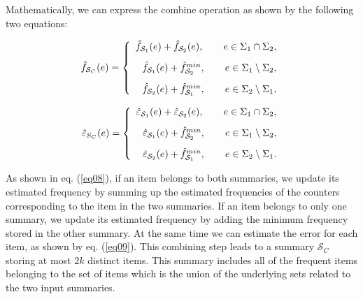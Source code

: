 \documentclass[final,3p,times]{elsarticle}
\begin{document}
Mathematically, we can express the combine operation as shown by the following two equations:

\begin{equation}
\label{eq08}
\hat{f}_{\mathcal{S}_C}(e) = 
\left\lbrace 
\begin{array}{r} 
\vspace{0.3cm}
\hat{f}_{\mathcal{S}_1}(e) + \hat{f}_{\mathcal{S}_2}(e), \qquad e \in \Sigma_1 \cap \Sigma_2, \\
\vspace{0.3cm}
\hat{f}_{\mathcal{S}_1}(e) + \hat{f}_{\mathcal{S}_2}^{min}, \qquad e \in \Sigma_1 \setminus \Sigma_2, \\
\hat{f}_{\mathcal{S}_2}(e) + \hat{f}_{\mathcal{S}_1}^{min}, \qquad e \in \Sigma_2 \setminus \Sigma_1,
\end{array}\right.
\end{equation}

\begin{equation}
\label{eq09}
\hat{\varepsilon}_{S_C}(e) = 
\left\lbrace 
\begin{array}{r} 
\vspace{0.3cm}
\hat{\varepsilon}_{\mathcal{S}_1}(e) + \hat{\varepsilon}_{\mathcal{S}_2}(e), \qquad e \in \Sigma_1 \cap \Sigma_2, \\
\vspace{0.3cm}
\hat{\varepsilon}_{\mathcal{S}_1}(e) + \hat{f}_{\mathcal{S}_2}^{min}, \qquad e \in \Sigma_1 \setminus \Sigma_2, \\
\hat{\varepsilon}_{\mathcal{S}_2}(e) + \hat{f}_{\mathcal{S}_1}^{min}, \qquad e \in \Sigma_2 \setminus \Sigma_1.
\end{array}\right.
\end{equation}

As shown in eq. (\ref{eq08}), if an item belongs to both summaries, we update its estimated frequency by summing up the estimated frequencies of the counters corresponding to the item in the two summaries. If an item belongs to only one summary, we update its estimated frequency by adding the minimum frequency stored in the other summary. At the same time we can estimate the error for each item, as shown by eq. (\ref{eq09}). This combining step leads to a summary $\mathcal{S}_C$ storing at most $2k$ distinct items. This summary includes all of the frequent items belonging to the set of items which is the union of the underlying sets related to the two input summaries.
\end{document}
